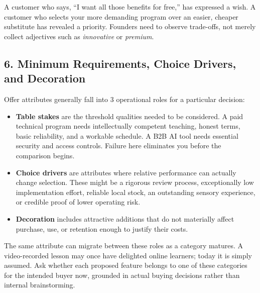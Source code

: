A customer who says, ``I want all those benefits for free,'' has expressed a wish. A customer who selects your more demanding program over an easier, cheaper substitute has revealed a priority. Founders need to observe trade-offs, not merely collect adjectives such as \emph{innovative} or \emph{premium}.

\subsection*{6. Minimum Requirements, Choice Drivers, and Decoration}

Offer attributes generally fall into 3 operational roles for a particular decision:

\begin{itemize}
    \item \textbf{Table stakes} are the threshold qualities needed to be considered. A paid technical program needs intellectually competent teaching, honest terms, basic reliability, and a workable schedule. A B2B AI tool needs essential security and access controls. Failure here eliminates you before the comparison begins.
    \item \textbf{Choice drivers} are attributes where relative performance can actually change selection. These might be a rigorous review process, exceptionally low implementation effort, reliable local stock, an outstanding sensory experience, or credible proof of lower operating risk.
    \item \textbf{Decoration} includes attractive additions that do not materially affect purchase, use, or retention enough to justify their costs.
\end{itemize}

The same attribute can migrate between these roles as a category matures. A video-recorded lesson may once have delighted online learners; today it is simply assumed. Ask whether each proposed feature belongs to one of these categories for the intended buyer now, grounded in actual buying decisions rather than internal brainstorming.
